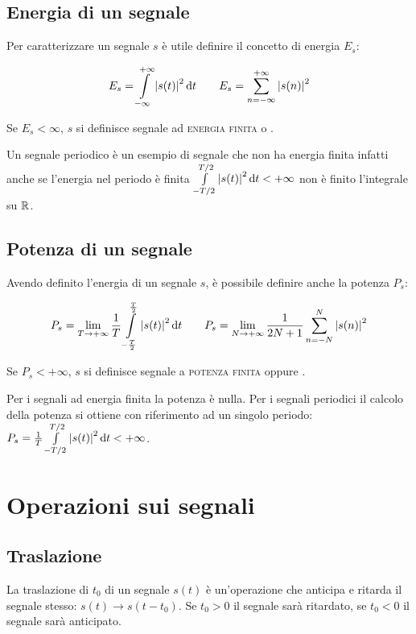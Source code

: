 \subsection{Energia di un segnale}
Per caratterizzare un segnale $s$ è utile definire il concetto di energia $E_s$:

\begin{equation}\label{eq:segnale_energia}
E_s=\int\limits_{-\infty}^{+\infty}{\left|{s(t)}\right|^2}{\,\mathop{}\!\mathrm{d}{t}} \qquad E_s=\sum_{n=-\infty}^{+\infty}\left|{s(n)}\right|^2
\end{equation}

Se $E_s < \infty$, $s$  si definisce segnale ad \textsc{energia finita} o .

Un segnale periodico è un esempio di segnale che non ha energia finita infatti anche se l'energia nel periodo è finita $\int\limits_{-T/2}^{T/2}{\left|{s(t)}\right|^2}{\,\mathop{}\!\mathrm{d}{t}}<+\infty$ non è finito l'integrale su $\mathbb{R}$.

\subsection{Potenza di un segnale}
Avendo definito l'energia di un segnale $s$, è possibile definire anche la potenza $P_s$:

\begin{equation}\label{eq:segnale_potenza}
P_s=\lim\limits_{T\to+\infty}{\frac{1}{T}\int\limits_{-\frac{T}{2}}^{\frac{T}{2}}{\left|{s(t)}\right|^2}{\,\mathop{}\!\mathrm{d}{t}}} \qquad
P_s=\lim\limits_{N\to+\infty}{\frac{1}{2N+1}\sum_{n=-N}^{N}{\left|{s(n)}\right|^2}}
\end{equation}

Se $P_s<+\infty$, $s$ si definisce segnale a \textsc{potenza finita} oppure .

Per i segnali ad energia finita la potenza è nulla. Per i segnali periodici il calcolo della potenza si ottiene con riferimento ad un singolo periodo: $P_s=\frac{1}{T}\int\limits_{-T/2}^{T/2}{\left|{s(t)}\right|^2}{\,\mathop{}\!\mathrm{d}{t}}<+\infty$.

\section{Operazioni sui segnali}
\subsection{Traslazione}
La traslazione di $t_0$ di un segnale $s(t)$ è un'operazione che anticipa e ritarda il segnale stesso:
$s(t) \to s(t-t_0)$. Se $t_0>0$ il segnale sarà ritardato, se $t_0<0$ il segnale sarà anticipato.
